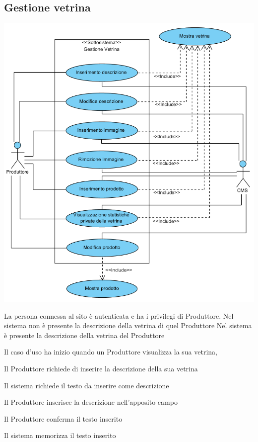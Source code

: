 \subsection{Gestione vetrina}
\begin{center}
   \includegraphics[width=\textwidth]{assets/visualParadigm/cu/GestioneVentrina}
\end{center}
{}
{La persona connessa al sito è autenticata e ha i privilegi di Produttore. Nel sistema non è presente la descrizione della vetrina di quel Produttore}
{Nel sistema è presente la descrizione della vetrina del Produttore}
{\begin{enumCU}
		\item Il caso d'uso ha inizio quando un Produttore visualizza la sua vetrina, 
		\item Il Produttore richiede di inserire la descrizione della sua vetrina
		\item Il sistema richiede il testo da inserire come descrizione 
		\item Il Produttore inserisce la descrizione nell'apposito campo\label{cuinsdescr:2}
		\item Il Produttore conferma il testo inserito
		\item Il sistema memorizza il testo inserito
	\end{enumCU}}
